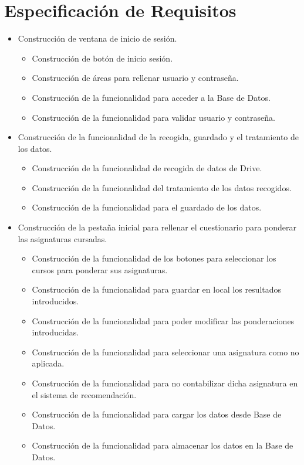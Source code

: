 \section{Especificación de Requisitos}
\begin{itemize}


\item Construcción de ventana de inicio de sesión. 
\begin{itemize}
\item Construcción de botón de inicio sesión. 
\item Construcción de áreas para rellenar usuario y contraseña.  
\item Construcción de la funcionalidad para acceder a la Base de Datos. 
\item Construcción de la funcionalidad para validar usuario y contraseña. 
\end{itemize}

\item Construcción de la funcionalidad de la recogida,  guardado y  el tratamiento de los datos. 
\begin{itemize}
\item Construcción de la funcionalidad de recogida de datos de Drive. 
\item Construcción de la funcionalidad del tratamiento de los datos recogidos. 
\item Construcción de la funcionalidad para el guardado de los datos. 

\end{itemize}

\item Construcción de la pestaña inicial para rellenar el cuestionario para ponderar las asignaturas cursadas. 
\begin{itemize}
\item Construcción de la funcionalidad de los botones para seleccionar los cursos para ponderar sus asignaturas. 
\item Construcción de la funcionalidad para guardar en local los resultados introducidos. 
\item Construcción de la funcionalidad para poder modificar las ponderaciones introducidas. 
\item Construcción de la funcionalidad para seleccionar una asignatura como no aplicada. 
\item Construcción de la funcionalidad para no contabilizar dicha asignatura en el sistema de recomendación. 
\item Construcción de la funcionalidad para cargar los datos desde Base de Datos. 
\item Construcción de la funcionalidad para almacenar los datos en la Base de Datos. 
\end{itemize}


\end{itemize}
